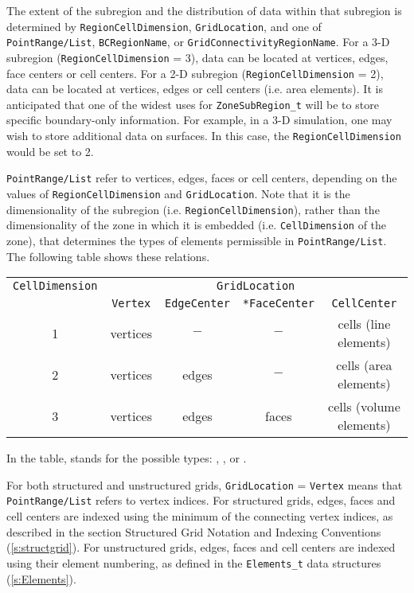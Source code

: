The extent of the subregion and the distribution of data within that subregion
is determined by \texttt{RegionCellDimension}, \texttt{GridLocation}, and one of
\texttt{PointRange/List}, \texttt{BCRegionName}, or \texttt{GridConnectivityRegionName}.
For a 3-D subregion (\texttt{RegionCellDimension} = 3), data can be located
at vertices, edges, face centers or cell centers.
For a 2-D subregion (\texttt{RegionCellDimension} = 2),
data can be located at vertices, edges or cell centers (i.e. area elements).
It is anticipated that one of the widest uses for \texttt{ZoneSubRegion\_t}
will be to store specific boundary-only information. For example, in a 3-D simulation,
one may wish to store additional data on surfaces. In this case, the
\texttt{RegionCellDimension} would be set to 2.

\texttt{PointRange/List} refer to vertices, edges, faces or cell centers,
depending on the values of \texttt{RegionCellDimension} and \texttt{GridLocation}.
Note that it is the dimensionality of the subregion (i.e. \texttt{RegionCellDimension}),
rather than the dimensionality of the zone in which it is embedded
(i.e. \texttt{CellDimension} of the zone), that determines the types of elements
permissible in \texttt{PointRange/List}. The following table shows these relations.

\begin{center}
\begin{tabular}{||c|c|c|c|c||}
 \hline
\texttt{CellDimension} & \multicolumn{4}{c||}{\texttt{GridLocation}} \\
& \texttt{Vertex} & \texttt{EdgeCenter} & \texttt{*FaceCenter} & \texttt{CellCenter} \\
 \hline
1 & vertices & $-$ & $-$ & cells (line elements) \\
2 & vertices & edges & $-$ & cells (area elements) \\
3 & vertices & edges & faces & cells (volume elements) \\
 \hline
\end{tabular}
\end{center}

In the table,  stands for the possible types: ,
,  or .

For both structured and unstructured grids, \texttt{GridLocation} = \texttt{Vertex}
means that \texttt{PointRange/List} refers to vertex indices. For structured grids,
edges, faces and cell centers are indexed using the minimum of the
connecting vertex indices, as described in the section
Structured Grid Notation and Indexing Conventions (\autoref{s:structgrid}).
For unstructured grids, edges, faces and
cell centers are indexed using their element numbering, as defined in
the \texttt{Elements\_t} data structures (\autoref{s:Elements}).

